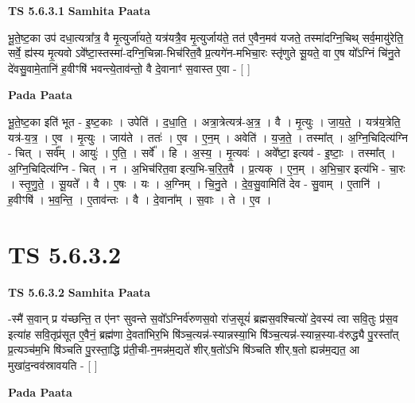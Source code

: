 \documentclass[17pt]{extarticle}
\begin{document}
\textbf{TS 5.6.3.1 } \newline
\textbf{Samhita Paata} \newline

भू॒ते॒ष्ट॒का उप॑ दधा॒त्यत्रा᳚त्र॒ वै मृ॒त्युर्जा॑यते॒ यत्र॑यत्रै॒व मृ॒त्युर्जाय॑ते॒ तत॑ ए॒वैन॒मव॑ यजते॒ तस्मा॑दग्नि॒चिथ् सर्व॒मायु॑रेति॒ सर्वे॒ ह्य॑स्य मृ॒त्यवो ऽवे᳚ष्टा॒स्तस्मा॑-दग्नि॒चिन्ना-भिच॑रित॒वै प्र॒त्यगे॑न-मभिचा॒रः स्तृ॑णुते सू॒यते॒ वा ए॒ष यो᳚ऽग्निं चि॑नु॒ते दे॑वसु॒वामे॒तानि॑ ह॒वीꣳषि॑ भवन्त्ये॒ताव॑न्तो॒ वै दे॒वानाꣳ॑ स॒वास्त ए॒वा - [  ] \newline

\textbf{Pada Paata} \newline

भू॒ते॒ष्ट॒का इति॑ भूत - इ॒ष्ट॒काः । उपेति॑ । द॒धा॒ति॒ । अत्रा॒त्रेत्यत्र॑-अ॒त्र॒ । वै । मृ॒त्युः । जा॒य॒ते॒ । यत्र॑य॒त्रेति॒ यत्र॑-य॒त्र॒ । ए॒व । मृ॒त्युः । जाय॑ते । ततः॑ । ए॒व । ए॒न॒म् । अवेति॑ । य॒ज॒ते॒ । तस्मा᳚त् । अ॒ग्नि॒चिदित्य॑ग्नि - चित् । सर्व᳚म् । आयुः॑ । ए॒ति॒ । सर्वे᳚ । हि । अ॒स्य॒ । मृ॒त्यवः॑ । अवे᳚ष्टा॒ इत्यव॑ - इ॒ष्टाः॒ । तस्मा᳚त् । अ॒ग्नि॒चिदित्य॑ग्नि - चित् । न । अ॒भिच॑रित॒वा इत्य॒भि-च॒रि॒त॒वै । प्र॒त्यक् । ए॒न॒म् । अ॒भि॒चा॒र इत्य॑भि - चा॒रः । स्तृ॒णु॒ते॒ । सू॒यते᳚ । वै । ए॒षः । यः । अ॒ग्निम् । चि॒नु॒ते । दे॒व॒सु॒वामिति॑ देव - सु॒वाम् । ए॒तानि॑ । ह॒वीꣳषि॑ । भ॒व॒न्ति॒ । ए॒ताव॑न्तः । वै । दे॒वाना᳚म् । स॒वाः । ते । ए॒व ।  \newline




\section*{ TS 5.6.3.2 }

\textbf{TS 5.6.3.2 } \newline
\textbf{Samhita Paata} \newline

-स्मै॑ स॒वान् प्र य॑च्छन्ति॒ त ए॑नꣳ सुवन्ते स॒वो᳚ऽग्निर्व॑रुणस॒वो रा॑ज॒सूयं॑ ब्रह्मस॒वश्चित्यो॑ दे॒वस्य॑ त्वा सवि॒तुः प्र॑स॒व इत्या॑ह सवि॒तृप्र॑सूत ए॒वैनं॒ ब्रह्म॑णा दे॒वता॑भिर॒भि षि॑ञ्च॒त्यन्न॑-स्यान्नस्या॒भि षि॑ञ्च॒त्यन्न॑-स्यान्न॒स्या-व॑रुद्ध्यै पु॒रस्ता᳚त् प्र॒त्यञ्च॑म॒भि षि॑ञ्चति पु॒रस्ता॒द्धि प्र॑ती॒ची-न॒मन्न॑म॒द्यते॑ शीर्.ष॒तो॑ऽभि षि॑ञ्चति शीर्.ष॒तो ह्यन्न॑म॒द्यत॒ आ मुखा॑द॒न्वव॑स्रावयति - [  ] \newline

\textbf{Pada Paata} \newline
\end{document}

